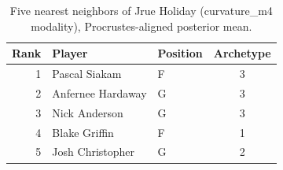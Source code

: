 \begin{table}[htbp]
  \centering\small
  \begin{tabular}{rllc}
    \toprule
    Rank & Player & Position & Archetype \\
    \midrule
    1 & Pascal Siakam & F & 3 \\
    2 & Anfernee Hardaway & G & 3 \\
    3 & Nick Anderson & G & 3 \\
    4 & Blake Griffin & F & 1 \\
    5 & Josh Christopher & G & 2 \\
    \bottomrule
  \end{tabular}
  \caption{Five nearest neighbors of Jrue Holiday (curvature_m4 modality), Procrustes-aligned posterior mean.}
  \label{tab:Jrue_Holiday_neighbors_curvature_m4}
\end{table}

